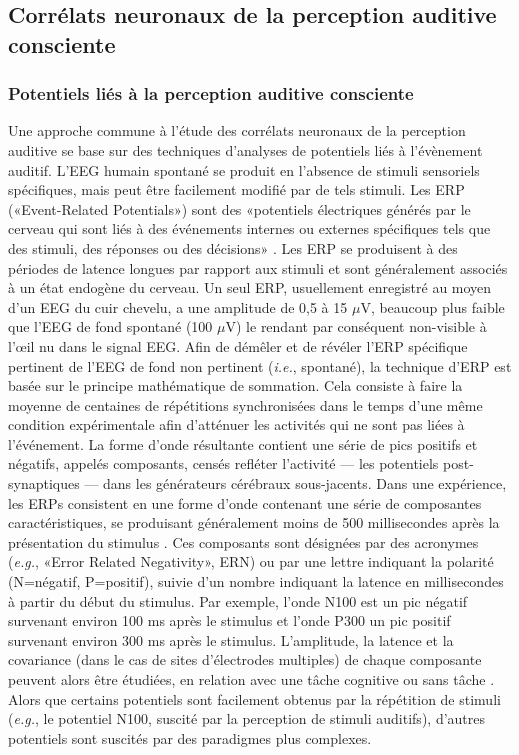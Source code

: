 \subsection{Corrélats neuronaux de la perception auditive consciente}

\subsubsection{Potentiels liés à la perception auditive consciente}

Une approche commune à l'étude des corrélats neuronaux de la perception auditive se base sur des techniques d'analyses de potentiels liés à l'évènement auditif. 
L'EEG humain spontané se produit en l'absence de stimuli sensoriels spécifiques, mais peut être facilement modifié par de tels stimuli. 
Les ERP («Event-Related Potentials») sont des «potentiels électriques générés par le cerveau qui sont liés à des événements internes ou externes spécifiques tels que des stimuli, des réponses ou des décisions» \citep{luck2014introduction}. 
Les ERP se produisent à des périodes de latence longues par rapport aux stimuli et sont généralement associés à un état endogène du cerveau. 
Un seul ERP, usuellement enregistré au moyen d'un EEG du cuir chevelu, a une amplitude de 0,5 à 15 $\mu$V, beaucoup plus faible que l'EEG de fond spontané (100 $\mu$V) le rendant par conséquent non-visible à l'œil nu dans le signal EEG. 
Afin de démêler et de révéler l'ERP spécifique pertinent de l'EEG de fond non pertinent (\textit{i.e.}, spontané), la technique d'ERP est basée sur le principe mathématique de sommation. 
Cela consiste à faire la moyenne de centaines de répétitions synchronisées dans le temps d'une même condition expérimentale afin d'atténuer les activités qui ne sont pas liées à l'événement. 
La forme d'onde résultante contient une série de pics positifs et négatifs, appelés composants, censés refléter l'activité --- les potentiels post-synaptiques --- dans les générateurs cérébraux sous-jacents. 
Dans une expérience, les ERPs consistent en une forme d'onde contenant une série de composantes caractéristiques, se produisant généralement moins de 500 millisecondes après la présentation du stimulus \citep{king2014characterizingthesis}. 
Ces composants sont désignées par des acronymes (\textit{e.g.}, «Error Related Negativity», ERN) ou par une lettre indiquant la polarité (N=négatif, P=positif), suivie d'un nombre indiquant la latence en millisecondes à partir du début du stimulus. 
Par exemple, l'onde N100 est un pic négatif survenant environ 100 ms après le stimulus et l'onde P300 un pic positif survenant environ 300 ms après le stimulus.
L'amplitude, la latence et la covariance (dans le cas de sites d'électrodes multiples) de chaque composante peuvent alors être étudiées, en relation avec une tâche cognitive ou sans tâche \citep{nunez2007electroencephalogram}. 
Alors que certains potentiels sont facilement obtenus par la répétition de stimuli (\textit{e.g.}, le potentiel N100, suscité par la perception de stimuli auditifs), d'autres potentiels sont suscités par des paradigmes plus complexes. 

